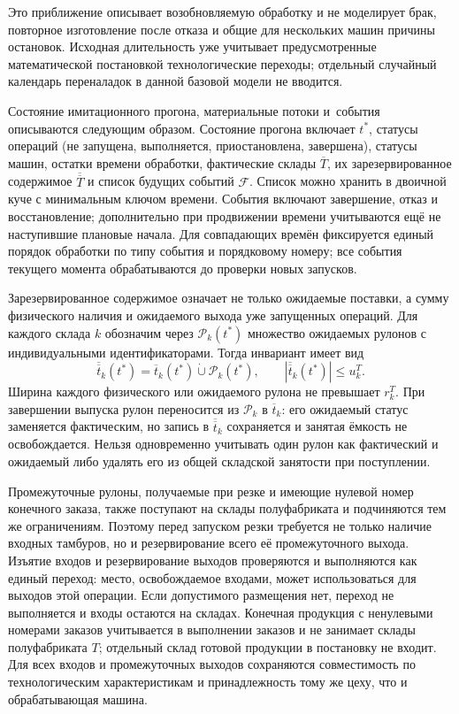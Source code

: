 Это приближение описывает возобновляемую обработку и не моделирует брак, повторное изготовление после отказа и общие для нескольких машин причины остановок. Исходная длительность уже учитывает предусмотренные математической постановкой технологические переходы; отдельный случайный календарь переналадок в данной базовой модели не вводится.

Состояние имитационного прогона, материальные потоки и~события описываются следующим образом. Состояние прогона включает $t^{*}$, статусы операций (не запущена, выполняется, приостановлена, завершена), статусы машин, остатки времени обработки, фактические склады $\overline{T}$, их зарезервированное содержимое $\overline{\overline{T}}$ и список будущих событий $\mathcal{F}$. Список можно хранить в двоичной куче с минимальным ключом времени. События включают завершение, отказ и восстановление; дополнительно при продвижении времени учитываются ещё не наступившие плановые начала. Для совпадающих времён фиксируется единый порядок обработки по типу события и порядковому номеру; все события текущего момента обрабатываются до проверки новых запусков.

Зарезервированное содержимое означает не только ожидаемые поставки, а сумму физического наличия и ожидаемого выхода уже запущенных операций. Для каждого склада $k$ обозначим через $\mathcal{P}_k(t^{*})$ множество ожидаемых рулонов с индивидуальными идентификаторами. Тогда инвариант имеет вид
\[
\overline{\overline{t}}_k(t^{*})
=\overline{t}_k(t^{*})\mathbin{\dot\cup}\mathcal{P}_k(t^{*}),
\qquad
|\overline{\overline{t}}_k(t^{*})|\leq u^T_k.
\]
Ширина каждого физического или ожидаемого рулона не превышает $r^T_k$. При завершении выпуска рулон переносится из $\mathcal{P}_k$ в $\overline{t}_k$: его ожидаемый статус заменяется фактическим, но запись в $\overline{\overline{t}}_k$ сохраняется и занятая ёмкость не освобождается. Нельзя одновременно учитывать один рулон как фактический и ожидаемый либо удалять его из общей складской занятости при поступлении.

Промежуточные рулоны, получаемые при резке и имеющие нулевой номер конечного заказа, также поступают на склады полуфабриката и подчиняются тем же ограничениям. Поэтому перед запуском резки требуется не только наличие входных тамбуров, но и резервирование всего её промежуточного выхода. Изъятие входов и резервирование выходов проверяются и выполняются как единый переход: место, освобождаемое входами, может использоваться для выходов этой операции. Если допустимого размещения нет, переход не выполняется и входы остаются на складах. Конечная продукция с ненулевыми номерами заказов учитывается в выполнении заказов и не занимает склады полуфабриката $T$; отдельный склад готовой продукции в постановку не входит. Для всех входов и промежуточных выходов сохраняются совместимость по технологическим характеристикам и принадлежность тому же цеху, что и обрабатывающая машина.

